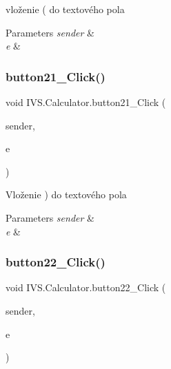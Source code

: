 vloženie \textquotesingle{}(\textquotesingle{} do textového pola 


\begin{DoxyParams}{Parameters}
{\em sender} & \\
\hline
{\em e} & \\
\hline
\end{DoxyParams}
\mbox{\label{class_i_v_s_1_1_calculator_a33dc653a738421ce3fe770c4c470a224}} 
\subsubsection{\texorpdfstring{button21\+\_\+\+Click()}{button21\_Click()}}
{\footnotesize\ttfamily void I\+V\+S.\+Calculator.\+button21\+\_\+\+Click (\begin{DoxyParamCaption}\item[{object}]{sender,  }\item[{Event\+Args}]{e }\end{DoxyParamCaption})\hspace{0.3cm}{\ttfamily [protected]}}



Vloženie \textquotesingle{})\textquotesingle{} do textového pola 


\begin{DoxyParams}{Parameters}
{\em sender} & \\
\hline
{\em e} & \\
\hline
\end{DoxyParams}
\mbox{\label{class_i_v_s_1_1_calculator_aabdaceb3733e6b9873224d39ba10aec0}} 
\subsubsection{\texorpdfstring{button22\+\_\+\+Click()}{button22\_Click()}}
{\footnotesize\ttfamily void I\+V\+S.\+Calculator.\+button22\+\_\+\+Click (\begin{DoxyParamCaption}\item[{object}]{sender,  }\item[{Event\+Args}]{e }\end{DoxyParamCaption})\hspace{0.3cm}{\ttfamily [protected]}}




